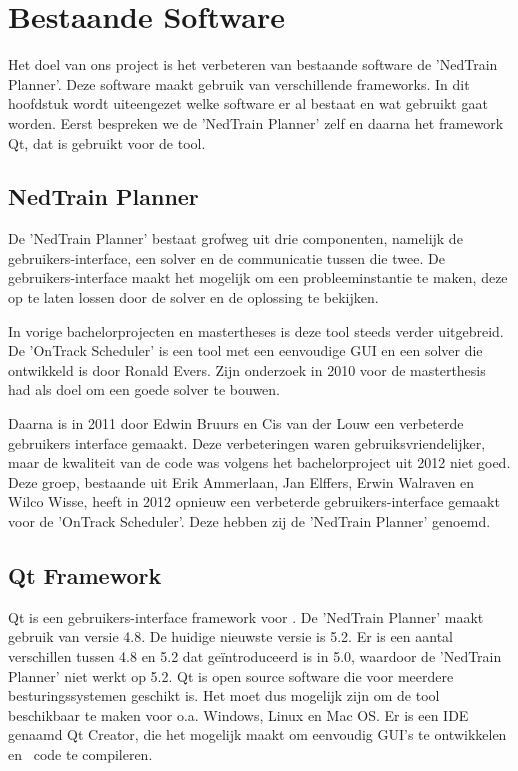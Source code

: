 \section{Bestaande Software}
Het doel van ons project is het verbeteren van bestaande software de 'NedTrain Planner'. Deze software maakt gebruik van verschillende frameworks. In dit hoofdstuk wordt uiteengezet welke software er al bestaat en wat gebruikt gaat worden. Eerst bespreken we de 'NedTrain Planner' zelf en daarna het framework Qt, dat is gebruikt voor de tool.

\subsection{NedTrain Planner}
\label{subsec:planner}
De 'NedTrain Planner' bestaat grofweg uit drie componenten, namelijk de gebruikers-interface, een solver en de communicatie tussen die twee. De gebruikers-interface maakt het mogelijk om een probleeminstantie te maken, deze op te laten lossen door de solver en de oplossing te bekijken.

In vorige bachelorprojecten en mastertheses is deze tool steeds verder uitgebreid. De 'OnTrack Scheduler' is een tool met een eenvoudige GUI en een solver die ontwikkeld is door Ronald Evers. Zijn onderzoek in 2010 voor de masterthesis had als doel om een goede solver te bouwen. \cite{ronaldevers2010}

Daarna is in 2011 door Edwin Bruurs en Cis van der Louw een verbeterde gebruikers interface gemaakt.\cite{bep2011nedtrain} Deze verbeteringen waren gebruiksvriendelijker, maar de kwaliteit van de code was volgens het bachelorproject uit 2012 niet goed.\cite{bep2012nedtrain} Deze groep, bestaande uit Erik Ammerlaan, Jan Elffers, Erwin Walraven en Wilco Wisse, heeft in 2012 opnieuw een verbeterde gebruikers-interface gemaakt voor de 'OnTrack Scheduler'. Deze hebben zij de 'NedTrain Planner' genoemd.

\subsection{Qt Framework}
Qt is een gebruikers-interface framework voor \cpp . De 'NedTrain Planner' maakt gebruik van versie 4.8. De huidige nieuwste versie is 5.2. Er is een aantal verschillen tussen 4.8 en 5.2 dat ge\"introduceerd is in 5.0, waardoor de 'NedTrain Planner' niet werkt op 5.2. Qt is open source software die voor meerdere besturingssystemen geschikt is. Het moet dus mogelijk zijn om de tool beschikbaar te maken voor o.a. Windows, Linux en Mac OS. Er is een IDE genaamd Qt Creator, die het mogelijk maakt om eenvoudig GUI's te ontwikkelen en \cpp\ code te compileren. \cite{seminarium2014}

